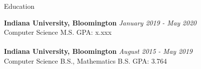 \documentclass{resume} %
\begin{document}

\begin{rSection}{Education}

{\bf Indiana University, Bloomington} \hfill {\em January 2019 - May 2020} \\
	Computer Science M.S. \hfill { GPA: x.xxx } \\ \\
{\bf Indiana University, Bloomington} \hfill {\em August 2015 - May 2019} \\
Computer Science B.S., Mathematics B.S. \hfill { GPA: 3.764 }


\end{rSection}



\end{document}
